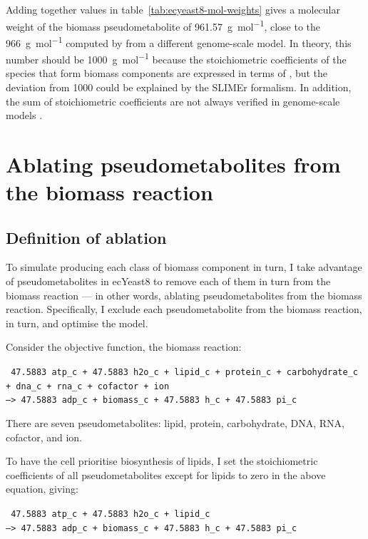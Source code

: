 Adding together values in table~\ref{tab:ecyeast8-mol-weights} gives a molecular weight of the biomass pseudometabolite of \SI{961.57}{\gram~\mol^{-1}}, close to the \SI{966}{\gram~\mol^{-1}} computed by \textcite{takhaveevTemporalSegregationBiosynthetic2023} from a different genome-scale model.
In theory, this number should be \SI{1000}{\gram~\mol^{-1}} because the stoichiometric coefficients of the species that form biomass components are expressed in terms of \SI{}{\mmolgdw} \parencite{thieleProtocolGeneratingHighquality2010, palssonSystemsBiologyConstraintbased2015}, but the deviation from 1000 could be explained by the SLIMEr formalism.
In addition, the sum of stoichiometric coefficients are not always verified in genome-scale models \parencite{chanStandardizingBiomassReactions2017}.


\section{Ablating pseudometabolites from the biomass reaction}
\label{sec:model-yeast8-pseudometabolites}

\subsection{Definition of ablation}
\label{sec:model-yeast8-pseudometabolites-def}

To simulate producing each class of biomass component in turn,
I take advantage of pseudometabolites in ecYeast8 to remove each of them in turn from the biomass reaction ---
in other words, ablating pseudometabolites from the biomass reaction.
Specifically, I exclude each pseudometabolite from the biomass reaction, in turn, and optimise the model.

Consider the objective function, the biomass reaction:

\texttt{
  47.5883 atp\_c + 47.5883 h2o\_c + lipid\_c + protein\_c + carbohydrate\_c\\
  + dna\_c + rna\_c + cofactor + ion \\
  --> 47.5883 adp\_c + biomass\_c + 47.5883 h\_c + 47.5883 pi\_c
}

There are seven pseudometabolites: lipid, protein, carbohydrate, DNA, RNA, cofactor, and ion.

To have the cell prioritise biosynthesis of lipids, I set the stoichiometric coefficients of all pseudometabolites except for lipids to zero in the above equation, giving:

\texttt{
  47.5883 atp\_c + 47.5883 h2o\_c + lipid\_c \\
  --> 47.5883 adp\_c + biomass\_c + 47.5883 h\_c + 47.5883 pi\_c
}

